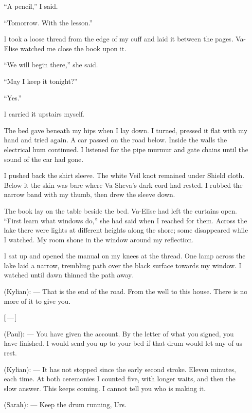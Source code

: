 ``A pencil,'' I said.\par

``Tomorrow. With the lesson.''\par

I took a loose thread from the edge of my cuff and laid it between the pages. Va-Elise watched me close the book upon it.\par

``We will begin there,'' she said.\par

``May I keep it tonight?''\par

``Yes.''\par

I carried it upstairs myself.\par

\ornament

The bed gave beneath my hips when I lay down. I turned, pressed it flat with my hand and tried again. A car passed on the road below. Inside the walls the electrical hum continued. I listened for the pipe murmur and gate chains until the sound of the car had gone.\par

I pushed back the shirt sleeve. The white Veil knot remained under Shield cloth. Below it the skin was bare where Va-Sheva's dark cord had rested. I rubbed the narrow band with my thumb, then drew the sleeve down.\par

The book lay on the table beside the bed. Va-Elise had left the curtains open. ``First learn what windows do,'' she had said when I reached for them. Across the lake there were lights at different heights along the shore; some disappeared while I watched. My room shone in the window around my reflection.\par

I sat up and opened the manual on my knees at the thread. One lamp across the lake laid a narrow, trembling path over the black surface towards my window. I watched until dawn thinned the path away.\par

\ornament

\begin{room}

(Kylian): --- That is the end of the road. From the well to this house. There is no more of it to give you.

\centerline{[\,---\,]}

(Paul): --- You have given the account. By the letter of what you signed, you have finished. I would send you up to your bed if that drum would let any of us rest.

(Kylian): --- It has not stopped since the early second stroke. Eleven minutes, each time. At both ceremonies I counted five, with longer waits, and then the slow answer. This keeps coming. I cannot tell you who is making it.

(Sarah): --- Keep the drum running, Urs.

\end{room}

\ornament
